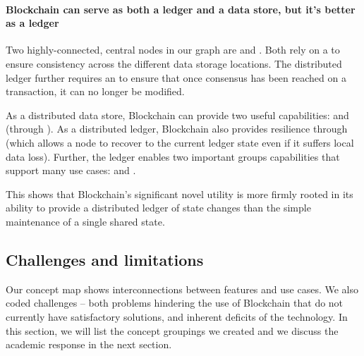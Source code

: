 {\paragraph{Blockchain can serve as both a ledger and a data store, but it's better as a ledger}
Two highly-connected, central nodes in our graph are  and . Both rely on a  to ensure consistency across the different data storage locations. The distributed ledger further requires an  to ensure that once consensus has been reached on a transaction, it can no longer be modified. 

As a distributed data store, Blockchain can provide two useful capabilities:  and  (through ). As a distributed ledger, Blockchain also provides resilience through  (which allows a node to recover to the current ledger state even if it suffers local data loss). Further, the ledger enables two important groups capabilities that support many use cases:  and . 

This shows that Blockchain's significant novel utility is more firmly rooted in its ability to provide a distributed ledger of state changes than the simple maintenance of a single shared state.

\subsection{Challenges and limitations}
\label{subsec:challenges}


Our concept map shows interconnections between features and use cases. We also coded challenges -- both problems hindering the use of Blockchain that do not currently have satisfactory solutions, and inherent deficits of the technology. In this section, we will list the concept groupings we created and we discuss the academic response in the next section.

}
